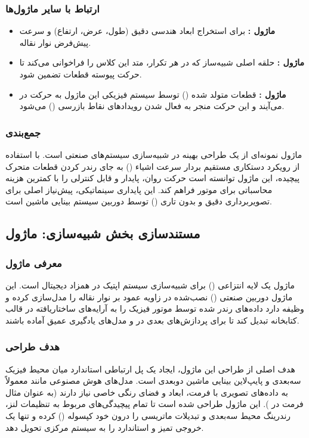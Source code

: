 \documentclass{article}
\begin{document}
\subsubsection{ارتباط با سایر ماژول‌ها}
\begin{itemize}
	\item \textbf{ماژول :} برای استخراج ابعاد هندسی دقیق (طول، عرض، ارتفاع) و سرعت پیش‌فرض نوار نقاله.
	\item \textbf{ماژول :} حلقه اصلی شبیه‌ساز که در هر تکرار، متد  این کلاس را فراخوانی می‌کند تا حرکت پیوسته قطعات تضمین شود.
	\item \textbf{ماژول :} قطعات متولد شده () توسط سیستم فیزیکی این ماژول به حرکت در می‌آیند و این حرکت منجر به فعال شدن رویدادهای نقاط بازرسی () می‌شود.
\end{itemize}

\subsubsection{جمع‌بندی}
ماژول  نمونه‌ای از یک طراحی بهینه در شبیه‌سازی سیستم‌های صنعتی است. با استفاده از رویکرد دستکاری مستقیم بردار سرعت اشیاء () به جای رندر کردن قطعات متحرک پیچیده، این ماژول توانسته است حرکت روان، پایدار و قابل کنترلی را با کمترین هزینه محاسباتی برای موتور  فراهم کند. این پایداری سینماتیکی، پیش‌نیاز اصلی برای تصویربرداری دقیق و بدون تاری () توسط دوربین سیستم بینایی ماشین است.

\subsection{مستندسازی بخش شبیه‌سازی: ماژول }

\subsubsection{معرفی ماژول}
ماژول  یک لایه انتزاعی () برای شبیه‌سازی سیستم اپتیک در همزاد دیجیتال است. این ماژول دوربین صنعتی () نصب‌شده در زاویه عمود بر نوار نقاله را مدل‌سازی کرده و وظیفه دارد داده‌های رندر شده توسط موتور فیزیک  را به آرایه‌های ساختاریافته در قالب کتابخانه  تبدیل کند تا برای پردازش‌های بعدی در  و مدل‌های یادگیری عمیق آماده باشند.

\subsubsection{هدف طراحی}
هدف اصلی از طراحی این ماژول، ایجاد یک پل ارتباطی استاندارد میان محیط فیزیک سه‌بعدی و پایپ‌لاین بینایی ماشین دوبعدی است. مدل‌های هوش مصنوعی مانند  معمولاً به داده‌های تصویری با فرمت، ابعاد و فضای رنگی خاصی نیاز دارند (به عنوان مثال فرمت  در ). این ماژول طراحی شده است تا تمام پیچیدگی‌های مربوط به تنظیمات لنز، رندرینگ محیط سه‌بعدی و تبدیلات ماتریسی را درون خود کپسوله () کرده و تنها یک خروجی تمیز و استاندارد را به سیستم مرکزی تحویل دهد.
\end{document}

